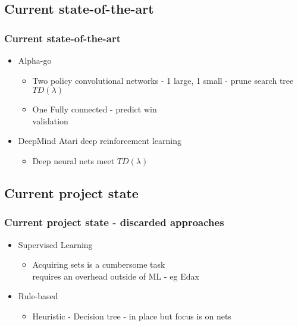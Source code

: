 \documentclass{beamer}
\begin{document}
\subsection{Current state-of-the-art}
\begin{frame}
\frametitle{Current state-of-the-art}
\begin{itemize}
\item<1->Alpha-go
\begin{itemize}
\item<2,3>Two policy convolutional networks - 1 large, 1  small - prune search tree\\$TD(\lambda)$
\item<3>One Fully connected - predict win\\validation
\end{itemize}
\item<4->DeepMind Atari deep reinforcement learning
\begin{itemize}
\item<5>Deep neural nets meet $TD(\lambda)$
\end{itemize}
\end{itemize}
\end{frame}

\subsection{Current project state}
\begin{frame}
\frametitle{Current project state - discarded approaches}
\begin{itemize}
\item<1->Supervised Learning
\begin{itemize}
\item<2>Acquiring sets is a cumbersome task\\ requires an overhead outside of ML - eg Edax
\end{itemize}
\item<3->Rule-based
\begin{itemize}
\item<4>Heuristic - Decision tree - in place but focus is on nets
\end{itemize}
\end{itemize}

\end{frame}
\end{document}
